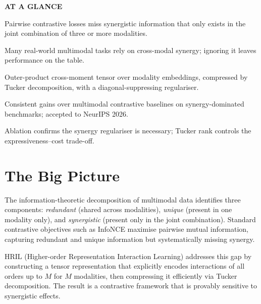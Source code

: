 \documentclass[10pt,twocolumn]{article}
\begin{document}
\begin{mdframed}[backgroundcolor=boxgray,linecolor=rulered,linewidth=1pt,
    innerleftmargin=6pt,innerrightmargin=6pt,
    innertopmargin=6pt,innerbottommargin=6pt]
\textbf{\small AT A GLANCE}\par\vspace{4pt}
\begin{description}[leftmargin=0pt,labelsep=4pt,itemsep=2pt,parsep=0pt,
    font=\small\bfseries]
  \item[Problem:] Pairwise contrastive losses miss synergistic information
    that only exists in the joint combination of three or more modalities.
  \item[Why it matters:] Many real-world multimodal tasks rely on
    cross-modal synergy; ignoring it leaves performance on the table.
  \item[Method:] Outer-product cross-moment tensor over modality
    embeddings, compressed by Tucker decomposition, with a diagonal-suppressing
    regulariser.
  \item[Result:] Consistent gains over multimodal contrastive baselines
    on synergy-dominated benchmarks; accepted to NeurIPS 2026.
  \item[Evidence:] Ablation confirms the synergy regulariser is necessary;
    Tucker rank controls the expressiveness--cost trade-off.
\end{description}
\end{mdframed}

\section{The Big Picture}

The information-theoretic decomposition of multimodal data identifies three
components: \emph{redundant} (shared across modalities), \emph{unique}
(present in one modality only), and \emph{synergistic} (present only in
the joint combination). Standard contrastive objectives such as InfoNCE
maximise pairwise mutual information, capturing redundant and unique
information but systematically missing synergy.

HRIL (Higher-order Representation Interaction Learning) addresses this gap
by constructing a tensor representation that explicitly encodes interactions
of all orders up to $M$ for $M$ modalities, then compressing it efficiently
via Tucker decomposition. The result is a contrastive framework that is
provably sensitive to synergistic effects.
\end{document}

